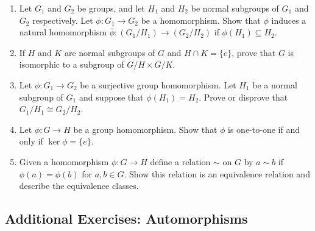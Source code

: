 {\begin{enumerate}
 
\item
Let $G_1$ and $G_2$ be groups, and let $H_1$ and $H_2$ be normal subgroups
of $G_1$ and $G_2$ respectively. Let $\phi : G_1 \rightarrow G_2$ be a
homomorphism. Show that $\phi$ induces a natural homomorphism
$\overline{\phi} : (G_1/H_1) \rightarrow (G_2/H_2)$ if $\phi(H_1) \subseteq
H_2$. 
 
 
\item
If $H$ and $K$ are normal subgroups of $G$ and $H \cap K = \{ e \}$,
prove that $G$ is isomorphic to a subgroup of $G/H \times G/K$.
 
 
 
\item
Let $\phi : G_1 \rightarrow G_2$ be a surjective group homomorphism.
Let $H_1$ be a normal subgroup of $G_1$ and suppose that $\phi(H_1) =
H_2$.  Prove or disprove that $G_1/H_1 \cong G_2/H_2$.
 
 
\item\label{homomorph:TrivialKernel}
Let $\phi : G \rightarrow H$ be a group homomorphism.  Show that
$\phi$ is one-to-one if and only if $\ker \phi = \{ e \}$.


\item
Given a homomorphism $\phi :G \rightarrow H$ define a relation $\sim$ on $G$ by $a \sim b$ if $\phi(a) = \phi(b)$ for $a, b \in G$.  Show this relation is an equivalence relation and describe the equivalence classes. 



\end{enumerate}
}
 


\subsection*{Additional Exercises: Automorphisms}
 
